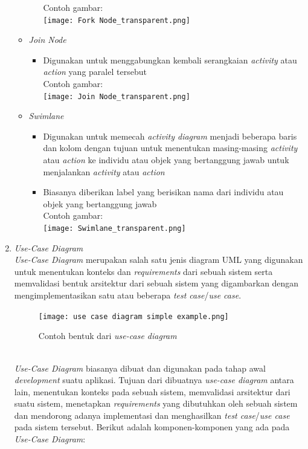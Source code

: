 \documentclass[a4paper]{article}
\begin{document}
\begin{enumerate}
\begin{itemize}
\begin{itemize}
                  Contoh gambar:\\
                  \texttt{[image: Fork Node\_transparent.png]}
        \end{itemize}
        \item \textit{Join Node}
        \begin{itemize}
            \item Digunakan untuk menggabungkan kembali serangkaian \textit{activity} atau \textit{action} yang paralel tersebut\autocite{systemanalysisdesign-activity-diagram}\\
                  Contoh gambar:\\
                  \texttt{[image: Join Node\_transparent.png]}
        \end{itemize}
        \item \textit{Swimlane}
        \begin{itemize}
            \item Digunakan untuk memecah \textit{activity diagram} menjadi beberapa baris dan kolom dengan tujuan untuk menentukan masing-masing \textit{activity} atau \textit{action} ke individu atau objek yang bertanggung jawab untuk menjalankan \textit{activity} atau \textit{action}
            \item Biasanya diberikan label yang berisikan nama dari individu atau objek yang bertanggung jawab\autocite{systemanalysisdesign-activity-diagram}\\
                  Contoh gambar:\\
                  \texttt{[image: Swimlane\_transparent.png]}
        \end{itemize}
    \end{itemize}
    \item \textit{Use-Case Diagram}\\
    \textit{Use-Case Diagram} merupakan salah satu jenis diagram UML yang digunakan untuk menentukan konteks dan \textit{requirements} dari sebuah sistem serta memvalidasi bentuk arsitektur dari sebuah sistem yang digambarkan dengan mengimplementasikan satu atau beberapa \textit{test case}/\textit{use case}\autocite{systemanalysisdesign-use-case-diagram}.
    \begin{figure}[h]
        \centering
        \texttt{[image: use case diagram simple example.png]}
        \caption{Contoh bentuk dari \textit{use-case diagram}}
    \end{figure}\\
    \textit{Use-Case Diagram} biasanya dibuat dan digunakan pada tahap awal \textit{development} suatu aplikasi. Tujuan dari dibuatnya \textit{use-case diagram} antara lain, menentukan konteks pada sebuah sistem, memvalidasi arsitektur dari suatu sistem, menetapkan \textit{requirements} yang dibutuhkan oleh sebuah sistem dan mendorong adanya implementasi dan menghasilkan \textit{test case}/\textit{use case} pada sistem tersebut. Berikut adalah komponen-komponen yang ada pada \textit{Use-Case Diagram}:

\end{enumerate}
\end{document}
